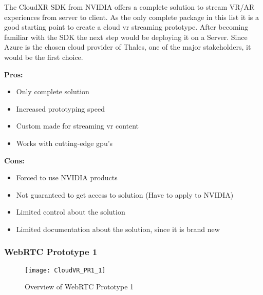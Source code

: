 The CloudXR SDK from NVIDIA offers a complete solution to stream VR/AR experiences from server to client. As the only complete package in this list it is a good starting point to create a cloud \acrshort{vr} streaming prototype. After becoming familiar with the SDK the next step would be deploying it on a Server. Since Azure is the chosen cloud provider of Thales, one of the major stakeholders, it would be the first choice. \\
\newline
\begin{varwidth}[t]{.5\textwidth}
\renewcommand\labelitemi{+}
\textbf{Pros:}
\begin{itemize}
\item Only complete solution
\item Increased prototyping speed
\item Custom made for streaming \acrshort{vr} content
\item Works with cutting-edge \acrshort{gpu}'s
\end{itemize}
\end{varwidth}
\hspace{4em}
\begin{varwidth}[t]{.5\textwidth}
\renewcommand\labelitemi{-}
\textbf{Cons:}
\begin{itemize}
\item Forced to use NVIDIA products
\item Not guaranteed to get access to solution (Have to apply to NVIDIA)
\item Limited control about the solution
\item Limited documentation about the solution, since it is brand new
\end{itemize}
\end{varwidth}

\newpage

\subsubsection{WebRTC Prototype 1}
\begin{figure}[h!]
\caption{Overview of WebRTC Prototype 1}
\label{fig:pr11}
\texttt{[image: CloudVR\_PR1\_1]}
\end{figure}

